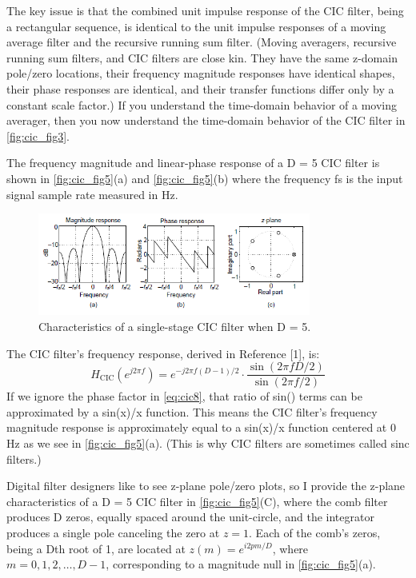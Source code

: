 The key issue is that the combined unit impulse response of the CIC filter, being a rectangular sequence, is identical to the unit impulse responses of a moving average filter and the recursive running sum filter. (Moving averagers, recursive running sum filters, and CIC filters are close kin. They have the same z-domain pole/zero locations, their frequency magnitude responses have identical shapes, their phase responses are identical, and their transfer functions differ only by a constant scale factor.) If you understand the time-domain behavior of a moving averager, then you now understand the time-domain behavior of the CIC filter in \autoref{fig:cic_fig3}. 

The frequency magnitude and linear-phase response of a D = 5 CIC filter is shown in \autoref{fig:cic_fig5}(a) and \autoref{fig:cic_fig5}(b) where the frequency fs is the input signal sample rate measured in Hz.
\begin{figure}[!ht]
    \centering
    \includegraphics[width=0.8\textwidth]{images/CIC_Filter/CIC_digital_filters_fig5.png}
    \caption{Characteristics of a single-stage CIC filter when D = 5.}
    \label{fig:cic_fig5}
\end{figure}
The CIC filter's frequency response, derived in Reference [1], is: 
\begin{equation}\label{eq:cic8}
H_{\mathrm{CIC}}\left(e^{j 2 \pi f}\right)=e^{-j 2 \pi f(D-1) / 2} \cdot \frac{\sin (2 \pi f D / 2)}{\sin (2 \pi f / 2)}
\end{equation}
If we ignore the phase factor in \autoref{eq:cic8}, that ratio of sin() terms can be approximated by a sin(x)/x function. This means the CIC filter's frequency magnitude response is approximately equal to a sin(x)/x function centered at 0 Hz as we see in \autoref{fig:cic_fig5}(a). (This is why CIC filters are sometimes called sinc filters.)

Digital filter designers like to see z-plane pole/zero plots, so I provide the z-plane characteristics of a D = 5 CIC filter in \autoref{fig:cic_fig5}(C), where the comb filter produces D zeros, equally spaced around the unit-circle, and the integrator produces a single pole canceling the zero at $z=1$. Each of the comb's zeros, being a Dth root of 1, are located at $z(m)=e^{i 2 p m / D}$, where $m=0,1,2, \ldots, D-1$, corresponding to a magnitude null in \autoref{fig:cic_fig5}(a).

